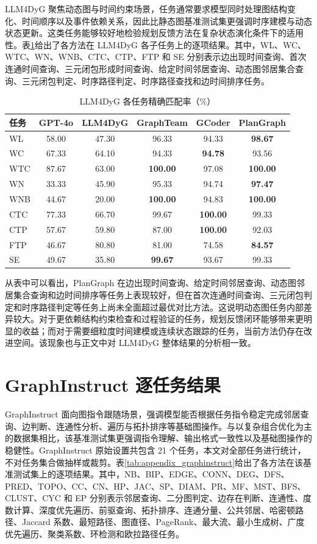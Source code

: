 LLM4DyG 聚焦动态图与时间约束场景，任务通常要求模型同时处理图结构变化、时间顺序以及事件依赖关系，因此比静态图基准测试集更强调时序建模与动态状态更新\cite{llm4dyg2024}。这类任务能够较好地检验规划反馈方法在复杂状态演化条件下的适用性。表\ref{tab:appendix_llm4dyg}给出了各方法在 LLM4DyG 各子任务上的逐项结果。其中，WL、WC、WTC、WN、WNB、CTC、CTP、FTP 和 SE 分别表示边出现时间查询、首次连通时间查询、三元闭包形成时间查询、给定时间邻居查询、动态图邻居集合查询、三元闭包判定、时序路径判定、时序路径查找和边时间排序任务。

\begin{table}[H]
\centering
\small
\caption{LLM4DyG 各任务精确匹配率（\%）}
\label{tab:appendix_llm4dyg}
\begin{tabular}{lccccc}
\toprule
任务 & GPT-4o & LLM4DyG & GraphTeam & GCoder & PlanGraph \\
\midrule
WL & 58.00 & 47.30 & 96.33 & 94.33 & \textbf{98.67} \\
WC & 67.33 & 64.10 & 94.33 & \textbf{94.78} & 93.56 \\
WTC & 87.67 & 63.00 & \textbf{100.00} & 97.08 & \textbf{100.00} \\
WN & 33.33 & 45.90 & 95.33 & 94.74 & \textbf{97.47} \\
WNB & 44.67 & 20.00 & \textbf{100.00} & 94.83 & \textbf{100.00} \\
CTC & 77.33 & 66.70 & 99.67 & \textbf{100.00} & 99.33 \\
CTP & 57.67 & 59.80 & 87.00 & \textbf{100.00} & 92.03 \\
FTP & 46.67 & 80.80 & 81.00 & 74.58 & \textbf{84.57} \\
SE & 49.67 & 35.80 & \textbf{99.67} & 93.67 & 99.33 \\
\bottomrule
\end{tabular}
\end{table}

从表中可以看出，PlanGraph 在边出现时间查询、给定时间邻居查询、动态图邻居集合查询和边时间排序等任务上表现较好，但在首次连通时间查询、三元闭包判定和时序路径判定等任务上尚未全面超过最优对比方法。这说明动态图任务内部差异较大。对于更依赖结构约束检查和过程验证的任务，规划反馈闭环能够带来更明显的收益；而对于需要细粒度时间建模或连续状态跟踪的任务，当前方法仍存在改进空间。该现象也与正文中对 LLM4DyG 整体结果的分析相一致。
\section{GraphInstruct 逐任务结果}

GraphInstruct 面向图指令跟随场景，强调模型能否根据任务指令稳定完成邻居查询、边判断、连通性分析、遍历与拓扑排序等基础图操作\cite{graphinstruct2024}。与以复杂组合优化为主的数据集相比，该基准测试集更强调指令理解、输出格式一致性以及基础图操作的稳健性。GraphInstruct 原始设置共包含 21 个任务，本文对全部任务进行统计，不对任务集合做抽样或裁剪。表\ref{tab:appendix_graphinstruct}给出了各方法在该基准测试集上的逐项结果。其中，NB、BIP、EDGE、CONN、DEG、DFS、PRED、TOPO、CC、CN、HP、JAC、SP、DIAM、PR、MF、MST、BFS、CLUST、CYC 和 EP 分别表示邻居查询、二分图判定、边存在判断、连通性、度数计算、深度优先遍历、前驱查询、拓扑排序、连通分量、公共邻居、哈密顿路径、Jaccard 系数、最短路径、图直径、PageRank、最大流、最小生成树、广度优先遍历、聚类系数、环检测和欧拉路径任务。

